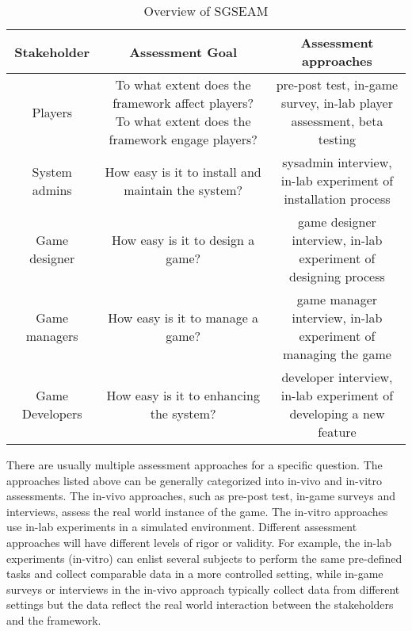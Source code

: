 \documentclass[11pt]{article}
\newcommand\tabhead[1]{\small\textbf{#1}}
\begin{document}
\begin{table}[ht!]
  \centering
  \begin{tabular}{|c|c|c|}
    \hline
    \multicolumn{1}{|p{0.2\columnwidth}|}{\centering\tabhead{Stakeholder}} &
    \multicolumn{1}{|p{0.35\columnwidth}|}{\centering\tabhead{Assessment Goal}} &
    \multicolumn{1}{|p{0.35\columnwidth}|}{\centering\tabhead{Assessment approaches}} \\
    \hline
    \multicolumn{1}{|p{0.2\columnwidth}|}{Players} &
    \multicolumn{1}{|p{0.35\columnwidth}|}{To what extent does the framework affect players?
        To what extent does the framework engage players?} &
    \multicolumn{1}{|p{0.35\columnwidth}|}{pre-post test, in-game survey, in-lab player assessment, beta testing} \\
    \hline
    \multicolumn{1}{|p{0.2\columnwidth}|}{System admins} &
    \multicolumn{1}{|p{0.35\columnwidth}|}{How easy is it to install and maintain the system?} &
    \multicolumn{1}{|p{0.35\columnwidth}|}{sysadmin interview, in-lab experiment of installation process} \\
    \hline
    \multicolumn{1}{|p{0.2\columnwidth}|}{Game designer} &
    \multicolumn{1}{|p{0.35\columnwidth}|}{How easy is it to design a game?} &
    \multicolumn{1}{|p{0.35\columnwidth}|}{game designer interview, in-lab experiment of designing process} \\
    \hline
    \multicolumn{1}{|p{0.2\columnwidth}|}{Game managers} &
    \multicolumn{1}{|p{0.35\columnwidth}|}{How easy is it to manage a game?} &
    \multicolumn{1}{|p{0.35\columnwidth}|}{game manager interview, in-lab experiment of managing the game} \\
    \hline
    \multicolumn{1}{|p{0.2\columnwidth}|}{Game Developers} &
    \multicolumn{1}{|p{0.35\columnwidth}|}{How easy is it to enhancing the system?} &
    \multicolumn{1}{|p{0.35\columnwidth}|}{developer interview, in-lab experiment of developing a new feature} \\
    \hline
  \end{tabular}
  \caption{Overview of SGSEAM}
  \label{table:overview}
\end{table}

There are usually multiple assessment approaches for a specific question. The approaches listed above can be generally categorized into in-vivo and in-vitro assessments. The in-vivo approaches, such as pre-post test, in-game surveys and interviews, assess the real world instance of the game. The in-vitro approaches use in-lab experiments in a simulated environment. Different assessment
approaches will have different levels of rigor or validity. For example, the in-lab experiments (in-vitro) can enlist several subjects to perform the same pre-defined tasks and collect comparable data in a more controlled setting, while in-game surveys or interviews in the in-vivo approach typically collect data from different settings but the data reflect the real world interaction between the stakeholders and the framework.
\end{document}
